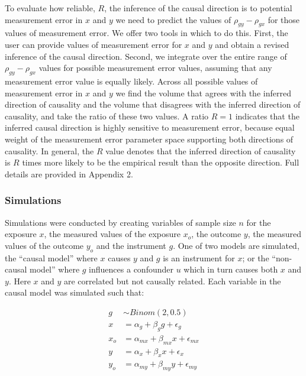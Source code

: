 \documentclass[]{article}
\begin{document}
To evaluate how reliable, \(R\), the inference of the causal direction
is to potential measurement error in \(x\) and \(y\) we need to predict
the values of \(\rho_{gy} - \rho_{gx}\) for those values of measurement
error. We offer two tools in which to do this. First, the user can
provide values of measurement error for \(x\) and \(y\) and obtain a
revised inference of the causal direction. Second, we integrate over the
entire range of \(\rho_{gy} - \rho_{gx}\) values for possible
measurement error values, assuming that any measurement error value is
equally likely. Across all possible values of measurement error in \(x\)
and \(y\) we find the volume that agrees with the inferred direction of
causality and the volume that disagrees with the inferred direction of
causality, and take the ratio of these two values. A ratio \(R=1\)
indicates that the inferred causal direction is highly sensitive to
measurement error, because equal weight of the measurement error
parameter space supporting both directions of causality. In general, the
\(R\) value denotes that the inferred direction of causality is \(R\)
times more likely to be the empirical result than the opposite
direction. Full details are provided in Appendix 2.

\subsubsection{Simulations}\label{simulations}

Simulations were conducted by creating variables of sample size \(n\)
for the exposure \(x\), the measured values of the exposure \(x_o\), the
outcome \(y\), the measured values of the outcome \(y_o\) and the
instrument \(g\). One of two models are simulated, the ``causal model''
where \(x\) causes \(y\) and \(g\) is an instrument for \(x\); or the
``non-causal model'' where \(g\) influences a confounder \(u\) which in
turn causes both \(x\) and \(y\). Here \(x\) and \(y\) are correlated
but not causally related. Each variable in the causal model was
simulated such that:

\[
\begin{aligned}
g & \sim Binom(2, 0.5) \\
x & = \alpha_g + \beta_g g + \epsilon_g \\
x_o & = \alpha_{mx} + \beta_{mx} x + \epsilon_{mx} \\
y & = \alpha_x + \beta_x x + \epsilon_x \\
y_o & = \alpha_{my} + \beta_{my} y + \epsilon_{my} \\
\end{aligned}
\]
\end{document}
